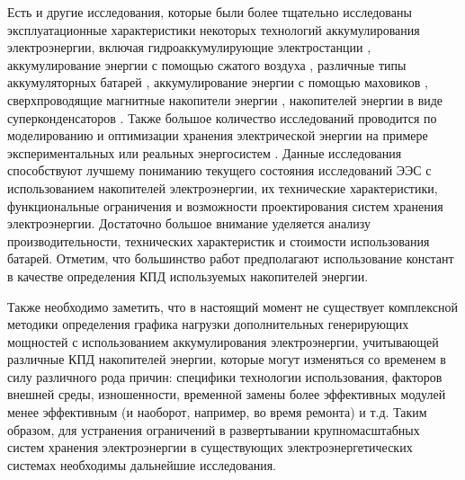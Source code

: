 Есть и другие исследования, которые были более тщательно исследованы эксплуатационные характеристики некоторых технологий аккумулирования электроэнергии, включая гидроаккумулирующие электростанции \cite{Punys2013190}, аккумулирование энергии с помощью сжатого воздуха \cite{Karellas2014865}, различные типы аккумуляторных батарей \cite{Dunn2011,Poullikkas2013778,Alotto2014325}, аккумулирование энергии с помощью маховиков \cite{Sebastian20126803,Bolund2007235}, сверхпроводящие магнитные накопители энергии \cite{Ali2010}, накопителей энергии в виде суперконденсаторов \cite{Noriega2013}.
Также большое количество исследований проводится по моделированию и оптимизации хранения электрической энергии на примере экспериментальных или реальных энергосистем \cite{Steffen2013556,Rugolo2012,DiSilvestre2013,Makarov2012,Barbour2012,Evans2013405}. %
Данные исследования способствуют лучшему пониманию текущего состояния исследований ЭЭС с использованием накопителей электроэнергии, их технические характеристики, функциональные ограничения и возможности проектирования систем хранения электроэнергии.
Достаточно большое внимание уделяется анализу производительности, технических характеристик и стоимости использования батарей.
Отметим, что большинство работ предполагают использование констант в качестве определения %
КПД
используемых накопителей энергии.

Также необходимо заметить, что в настоящий момент не существует комплексной методики определения графика нагрузки дополнительных генерирующих мощностей с использованием аккумулирования электроэнергии, %
учитывающей различные %
КПД
накопителей энергии, которые могут изменяться со временем в силу различного рода причин: специфики технологии использования, факторов внешней среды, изношенности, временной замены более эффективных модулей менее эффективным (и наоборот, например, во время ремонта) и т.д.
Таким образом, для устранения ограничений в развертывании крупномасштабных систем хранения электроэнергии в существующих электроэнергетических системах необходимы дальнейшие исследования.